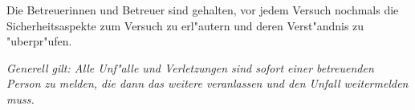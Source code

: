 
Die Betreuerinnen und Betreuer sind gehalten, vor jedem Versuch
nochmals die Sicherheitsaspekte zum Versuch zu erl"autern und deren
Verst"andnis zu "uberpr"ufen.

\emph{Generell gilt: Alle Unf"alle und Verletzungen sind sofort einer
betreuenden Person zu melden, die dann das weitere veranlassen und
den Unfall weitermelden muss.}


